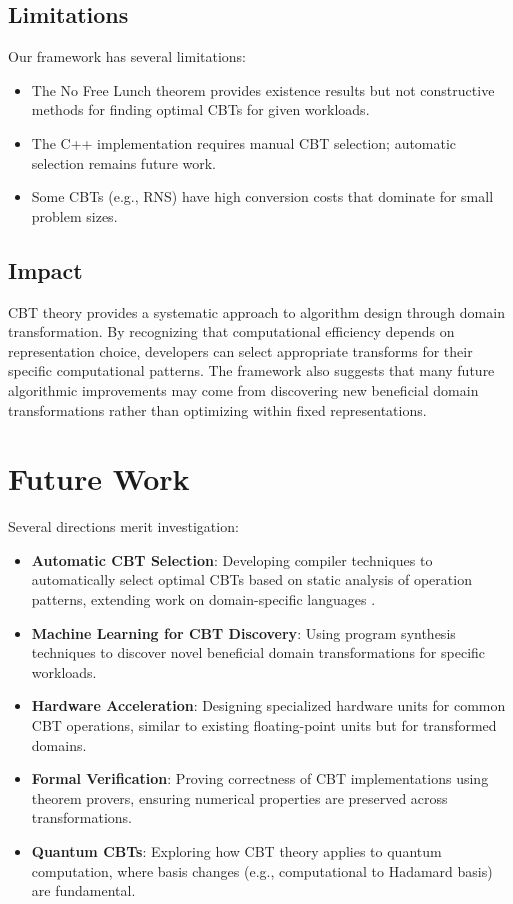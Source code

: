 \documentclass[12pt,a4paper]{article}
\theoremstyle{definition}
\begin{document}
\subsection{Limitations}

Our framework has several limitations:
\begin{itemize}
\item The No Free Lunch theorem provides existence results but not constructive methods for finding optimal CBTs for given workloads.
\item The C++ implementation requires manual CBT selection; automatic selection remains future work.
\item Some CBTs (e.g., RNS) have high conversion costs that dominate for small problem sizes.
\end{itemize}

\subsection{Impact}

CBT theory provides a systematic approach to algorithm design through domain transformation. By recognizing that computational efficiency depends on representation choice, developers can select appropriate transforms for their specific computational patterns. The framework also suggests that many future algorithmic improvements may come from discovering new beneficial domain transformations rather than optimizing within fixed representations.

\section{Future Work}

Several directions merit investigation:

\begin{itemize}
\item \textbf{Automatic CBT Selection}: Developing compiler techniques to automatically select optimal CBTs based on static analysis of operation patterns, extending work on domain-specific languages \cite{mernik2005and}.

\item \textbf{Machine Learning for CBT Discovery}: Using program synthesis techniques \cite{gulwani2017program} to discover novel beneficial domain transformations for specific workloads.

\item \textbf{Hardware Acceleration}: Designing specialized hardware units for common CBT operations, similar to existing floating-point units but for transformed domains.

\item \textbf{Formal Verification}: Proving correctness of CBT implementations using theorem provers, ensuring numerical properties are preserved across transformations.

\item \textbf{Quantum CBTs}: Exploring how CBT theory applies to quantum computation, where basis changes (e.g., computational to Hadamard basis) are fundamental.
\end{itemize}
\end{document}
